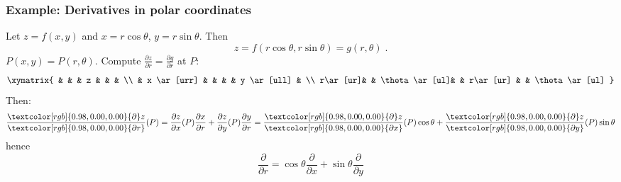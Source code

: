 \begin{frame}
  \frametitle{Example: Derivatives in polar coordinates}

Let $z=f(x,y)$ and $x=r\cos\theta$, $y=r\sin\theta$. Then
%
$$z=f(r\cos\theta, r\sin\theta) = g(r, \theta) \; .$$
%
$P(x,y) = P(r,\theta)$. Compute $\frac{\partial z}{\partial r} = \frac{\partial g}{\partial r}$ at $P$:
%
$$\xymatrix{
 &   &        & z &    &   & \\
 & x \ar[urr] &        &   &    & y \ar[ull] & \\
r\ar[ur]&   & \theta \ar[ul]&   &  r\ar[ur] &   & \theta \ar[ul]
}$$
%
Then:
%
$$
  \frac{\textcolor[rgb]{0.98,0.00,0.00}{\partial} z}{\textcolor[rgb]{0.98,0.00,0.00}{\partial r}} (P) = \frac{\partial z}{\partial x} (P)\frac{\partial x}{\partial r} + \frac{\partial z}{\partial y}(P) \frac{\partial y}{\partial r} = \frac{\textcolor[rgb]{0.98,0.00,0.00}{\partial} z}{\textcolor[rgb]{0.98,0.00,0.00}{\partial x}}(P) \cos\theta + \frac{\textcolor[rgb]{0.98,0.00,0.00}{\partial} z}{\textcolor[rgb]{0.98,0.00,0.00}{\partial y}} (P) \sin\theta
$$
%
hence
%
$$\frac{\partial}{\partial r} = \cos\theta\frac{\partial }{\partial x}  + \sin\theta\frac{\partial }{\partial y} $$
\end{frame}